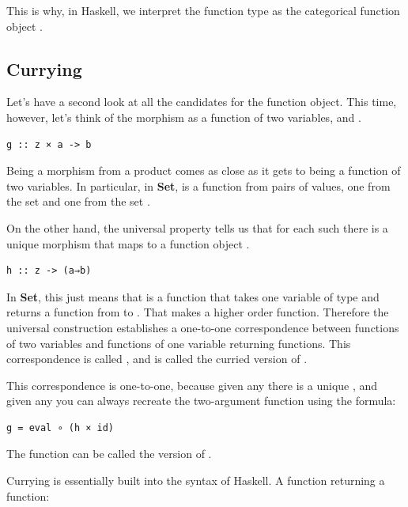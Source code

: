 This is why, in Haskell, we interpret the function type
 as the categorical function object
.

\subsection{Currying}\label{currying}

Let's have a second look at all the candidates for the function object.
This time, however, let's think of the morphism  as a function
of two variables,  and .

\begin{verbatim}
g :: z × a -> b
\end{verbatim}

Being a morphism from a product comes as close as it gets to being a
function of two variables. In particular, in \textbf{Set},  is
a function from pairs of values, one from the set  and one
from the set .

On the other hand, the universal property tells us that for each such
 there is a unique morphism  that maps  to
a function object .

\begin{verbatim}
h :: z -> (a⇒b)
\end{verbatim}

In \textbf{Set}, this just means that  is a function that
takes one variable of type  and returns a function from
 to . That makes  a higher order function.
Therefore the universal construction establishes a one-to-one
correspondence between functions of two variables and functions of one
variable returning functions. This correspondence is called
, and  is called the curried version of
.

This correspondence is one-to-one, because given any  there is
a unique , and given any  you can always recreate
the two-argument function  using the formula:

\begin{verbatim}
g = eval ∘ (h × id)
\end{verbatim}

The function  can be called the  version of
.

Currying is essentially built into the syntax of Haskell. A function
returning a function:

